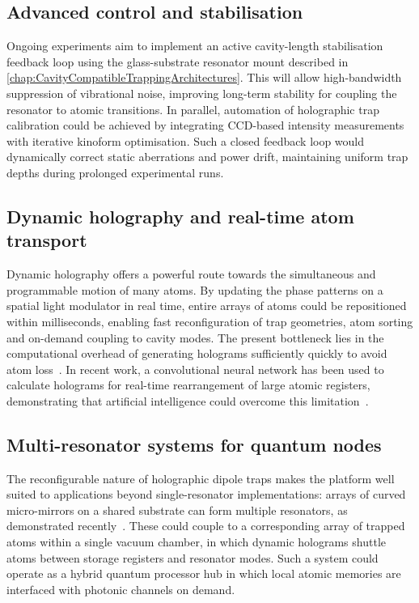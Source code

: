\documentclass[../Thesis-IJspeert.tex]{subfiles}
\begin{document}
\subsection{Advanced control and stabilisation}
Ongoing experiments aim to implement an active cavity-length stabilisation feedback loop using the glass-substrate resonator mount described in \autoref{chap:CavityCompatibleTrappingArchitectures}. This will allow high-bandwidth suppression of vibrational noise, improving long-term stability for coupling the resonator to atomic transitions. In parallel, automation of holographic trap calibration could be achieved by integrating CCD-based intensity measurements with iterative kinoform optimisation. Such a closed feedback loop would dynamically correct static aberrations and power drift, maintaining uniform trap depths during prolonged experimental runs.

\subsection{Dynamic holography and real-time atom transport}
Dynamic holography offers a powerful route towards the simultaneous and programmable motion of many atoms. By updating the phase patterns on a spatial light modulator in real time, entire arrays of atoms could be repositioned within milliseconds, enabling fast reconfiguration of trap geometries, atom sorting and on-demand coupling to cavity modes. The present bottleneck lies in the computational overhead of generating holograms sufficiently quickly to avoid atom loss~\cite{Lee2017,Kim2019}. In recent work, a convolutional neural network has been used to calculate holograms for real-time rearrangement of large atomic registers, demonstrating that artificial intelligence could overcome this limitation~\cite{Lin2025}.

\subsection{Multi-resonator systems for quantum nodes}
The reconfigurable nature of holographic dipole traps makes the platform well suited to applications beyond single-resonator implementations: arrays of curved micro-mirrors on a shared substrate can form multiple resonators, as demonstrated recently~\cite{Doherty2023}. These could couple to a corresponding array of trapped atoms within a single vacuum chamber, in which dynamic holograms shuttle atoms between storage registers and resonator modes. Such a system could operate as a hybrid quantum processor hub in which local atomic memories are interfaced with photonic channels on demand.
\end{document}
